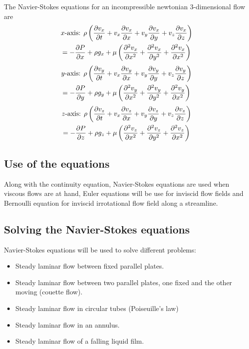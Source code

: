 \documentclass[10pt, twocolumn]{article}
\begin{document}
The Navier-Stokes equations for an incompressible newtonian 3-dimensional flow are
\begin{multline*}
  x \text{-axis: } \rho \left( \frac{\partial v_x}{\partial t} + v_x \frac{\partial v_x}{\partial x} + v_y \frac{\partial v_x}{\partial y} + v_z \frac{\partial v_x}{\partial z} \right) \\
  = -\frac{\partial P}{\partial x} + \rho g_x + \mu \left( \frac{\partial^{2} v_x}{\partial x^{2}} + \frac{\partial^{2} v_x}{\partial y^{2}} + \frac{\partial^{2} v_x}{\partial x^{2}} \right)
\end{multline*}
\begin{multline*}
  y \text{-axis: } \rho \left( \frac{\partial v_y}{\partial t} + v_x \frac{\partial v_y}{\partial x} + v_y \frac{\partial v_y}{\partial y} + v_z \frac{\partial v_y}{\partial z} \right) \\
  = -\frac{\partial P}{\partial y} + \rho g_y + \mu \left( \frac{\partial^{2} v_y}{\partial x^{2}} + \frac{\partial^{2} v_y}{\partial y^{2}} + \frac{\partial^{2} v_y}{\partial x^{2}} \right)
\end{multline*}
\begin{multline*}
  z \text{-axis: } \rho \left( \frac{\partial v_z}{\partial t} + v_x \frac{\partial v_z}{\partial x} + v_y \frac{\partial v_z}{\partial y} + v_z \frac{\partial v_z}{\partial z} \right) \\
  = -\frac{\partial P}{\partial z} + \rho g_z + \mu \left( \frac{\partial^{2} v_z}{\partial x^{2}} + \frac{\partial^{2} v_z}{\partial y^{2}} + \frac{\partial^{2} v_z}{\partial x^{2}} \right)
\end{multline*}



\subsection{Use of the equations}
Along with the continuity equation, Navier-Stokes equations are used when viscous flows are at hand, Euler equations will be use for inviscid flow fields and Bernoulli equation for inviscid irrotational flow field along a streamline.



\subsection{Solving the Navier-Stokes equations}
Navier-Stokes equations will be used to solve different problems:
\begin{itemize}
  \item Steady laminar flow between fixed parallel plates.
  \item Steady laminar flow between two parallel plates, one fixed and the other moving (couette flow).
  \item Steady laminar flow in circular tubes (Poiseuille's law)
  \item Steady laminar flow in an annulus.
  \item Steady laminar flow of a falling liquid film.
\end{itemize}
\end{document}
